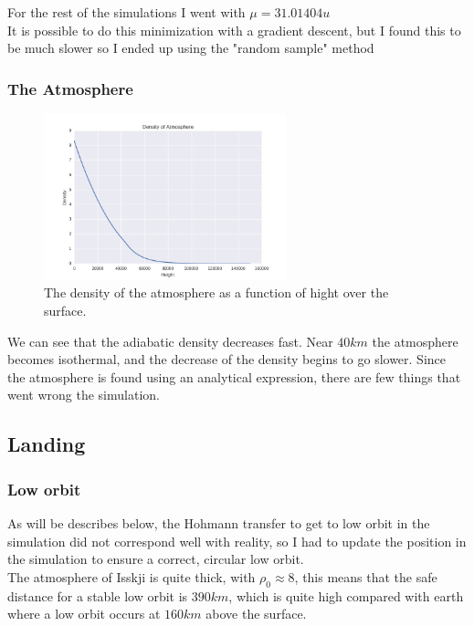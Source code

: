 \documentclass[a4paper, 10pt]{article}
\begin{document}
For the rest of the simulations I went with $\mu = 31.01404 u$\\

It is possible to do this minimization with a gradient descent, but I found this to be much slower so I ended up using the "random sample" method  

\subsubsection{The Atmosphere}

\begin{figure}[H]
\centering
\includegraphics[width = 70mm]{part6atmos.png}
\caption{The density of the atmosphere as a function of hight over the surface.}
\end{figure}

We can see that the adiabatic density decreases fast. Near $40 km$ the atmosphere becomes isothermal, and the decrease of the density begins to go slower. Since the atmosphere is found using an analytical expression, there are few things that went wrong the simulation.

\subsection{Landing}
\subsubsection{Low orbit}
As will be describes below, the Hohmann transfer to get to low orbit in the simulation did not correspond well with reality, so I had to update the position in the simulation to ensure a correct, circular low orbit.\\

The atmosphere of Isskji is quite thick, with $\rho_0 \approx 8$, this means that the safe distance for a stable low orbit is $390 km$, which is quite high compared with earth where a low orbit occurs at $160 km$ above the surface.\\
\end{document}
